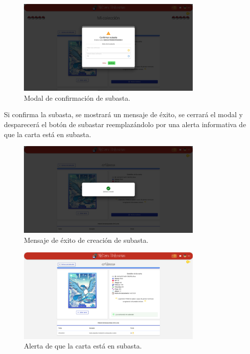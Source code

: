 \begin{figure}[H]
    \centering
    \includegraphics[width=0.8\textwidth]{figures/6-Analisis/6-Interfaz/interfaz/crear-subasta2.png}
    \caption{Modal de confirmación de subasta.}
    \label{fig:interfaz-subasta-confirmacion}
\end{figure}

Si confirma la subasta, se mostrará un mensaje de éxito, se cerrará el modal y desparecerá el botón de subastar reemplazándolo por una
alerta informativa de que la carta está en subasta.

\begin{figure}[H]
    \centering
    \includegraphics[width=0.8\textwidth]{figures/6-Analisis/6-Interfaz/interfaz/subasta_creada.png}
    \caption{Mensaje de éxito de creación de subasta.}
    \label{fig:interfaz-subasta-exito}
\end{figure}

\begin{figure}[H]
    \centering
    \includegraphics[width=0.8\textwidth]{figures/6-Analisis/6-Interfaz/interfaz/subasta_creada2.png}
    \caption{Alerta de que la carta está en subasta.}
    \label{fig:interfaz-subasta-alerta}
\end{figure}

